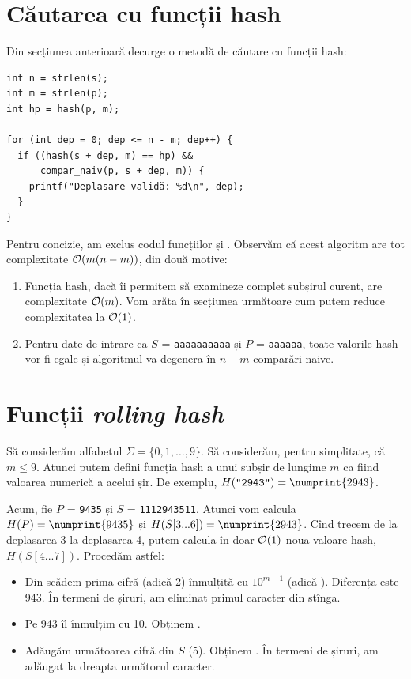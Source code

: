\documentclass[../main.tex]{subfiles}
\begin{document}
\section{Căutarea cu funcții hash}

Din secțiunea anterioară decurge o metodă de căutare cu funcții hash:

\begin{verbatim}
int n = strlen(s);
int m = strlen(p);
int hp = hash(p, m);

for (int dep = 0; dep <= n - m; dep++) {
  if ((hash(s + dep, m) == hp) &&
      compar_naiv(p, s + dep, m)) {
    printf("Deplasare validă: %d\n", dep);
  }
}
\end{verbatim}

Pentru concizie, am exclus codul funcțiilor  și . Observăm că acest algoritm are tot complexitate $\mathcal{O}(m(n-m))$, din două motive:

\begin{enumerate}
  \item Funcția hash, dacă îi permitem să examineze complet subșirul curent, are complexitate $\mathcal{O}(m)$. Vom arăta în secțiunea următoare cum putem reduce complexitatea la $\mathcal{O}(1)$.
  \item Pentru date de intrare ca $S$ = \texttt{aaaaaaaaaa} și $P$ = \texttt{aaaaaa}, toate valorile hash vor fi egale și algoritmul va degenera în $n-m$ comparări naive.
\end{enumerate}


\section{Funcții \textit{rolling hash}}

Să considerăm alfabetul $\Sigma = \{0, 1, \dots, 9\}$. Să considerăm, pentru simplitate, că $m \leq 9$. Atunci putem defini funcția hash a unui subșir de lungime $m$ ca fiind valoarea numerică a acelui șir. De exemplu, $H(\texttt{"2943"}) = \numprint{2943}$.

Acum, fie $P$ = \texttt{9435} și $S$ = \texttt{1112943511}. Atunci vom calcula $H(P) = \numprint{9435}$ și $H(S[3...6]) = \numprint{2943}$. Cînd trecem de la deplasarea 3 la deplasarea 4, putem calcula în doar $\mathcal{O}(1)$ noua valoare hash, $H(S[4...7])$. Procedăm astfel:

\begin{itemize}
  \item Din  scădem prima cifră (adică 2) înmulțită cu $10^{m - 1}$ (adică ). Diferența este 943. În termeni de șiruri, am eliminat primul caracter din stînga.
  \item Pe 943 îl înmulțim cu 10. Obținem .
  \item Adăugăm următoarea cifră din $S$ (5). Obținem . În termeni de șiruri, am adăugat la dreapta următorul caracter.
\end{itemize}
\end{document}

